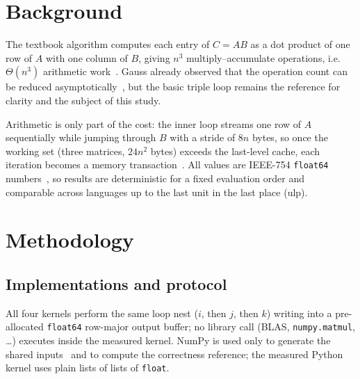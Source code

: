 \documentclass[11pt,a4paper]{article}
\begin{document}
\section{Background}

The textbook algorithm computes each entry of \(C = A B\) as a dot product of
one row of \(A\) with one column of \(B\), giving \(n^3\) multiply--accumulate
operations, i.e.\ \(\Theta(n^3)\) arithmetic work~\cite{knuth1997}. Gauss
already observed that the operation count can be reduced
asymptotically~\cite{strassen1969}, but the basic triple loop remains the
reference for clarity and the subject of this study.

Arithmetic is only part of the cost: the inner loop streams one row of \(A\)
sequentially while jumping through \(B\) with a stride of \(8n\) bytes, so once
the working set (three matrices, \(24n^2\) bytes) exceeds the last-level cache,
each iteration becomes a memory transaction~\cite{hennessy2017,frigo1999}. All
values are IEEE-754 \texttt{float64} numbers~\cite{ieee754}, so results are
deterministic for a fixed evaluation order and comparable across languages up
to the last unit in the last place (ulp).

\section{Methodology}

\subsection{Implementations and protocol}

All four kernels perform the same loop nest (\(i\), then \(j\), then \(k\))
writing into a pre-allocated \texttt{float64} row-major output buffer; no
library call (BLAS, \texttt{numpy.matmul}, \dots) executes inside the measured
kernel. NumPy is used only to generate the shared inputs~\cite{harris2020} and
to compute the correctness reference; the measured Python kernel uses plain
lists of lists of \texttt{float}.
\end{document}
